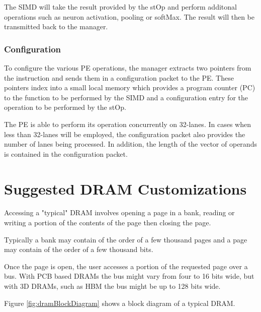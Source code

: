 \documentclass[journal]{IEEEtran}
\begin{document}
The SIMD will take the result provided by the stOp and perform additonal operations such as neuron activation, pooling or softMax. The result will then be transmitted back to the manager.

\subsubsection{Configuration}
\label{ssec:peConfiguration}

To configure the various PE operations, the manager extracts two pointers from the instruction and sends them in a configuration packet to the PE. These pointers index into a small local memory which provides a program counter (PC) to the function to be performed by the SIMD and a configuration entry for the operation to be performed by the stOp.

The PE is able to perform its operation concurrently on 32-lanes. 
In cases when less than 32-lanes will be employed, the configuration packet also provides the number of lanes being processed.
In addition, the length of the vector of operands is contained in the configuration packet.

\section{Suggested DRAM Customizations}
\label{sec:Suggested DRAM Customizations}

Accessing a "typical" DRAM involves opening a page in a bank, reading or writing a portion of the contents of the page then closing the page.

Typically a bank may contain of the order of a few thousand pages and a page may contain of the order of a few thousand bits.

Once the page is open, the user accesses a portion of the requested page over a bus. With PCB based DRAMs the bus might vary from four to 16 bits wide, but with 3D DRAMs, such as HBM the bus might be up to 128 bits wide.

Figure \ref{fig:dramBlockDiagram} shows a block diagram of a typical DRAM.
\end{document}
